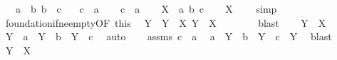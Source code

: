 \begin{isabellebody}
\ \ \ {\isachardoublequoteopen}a\ {\isasymin}\ b{\isachardoublequoteclose}\ {\isachardoublequoteopen}b\ {\isasymin}\ c{\isachardoublequoteclose}\isanewline
\ \ \ {\isachardoublequoteopen}c\ {\isasymnotin}\ a{\isachardoublequoteclose}\isanewline
%
\isadelimproof
%
\endisadelimproof
%
\isatagproof
{}\isamarkupfalse%
\isanewline
\ \ \isamarkupfalse%
\ {\isachardoublequoteopen}c\ {\isasymin}\ a{\isachardoublequoteclose}\isanewline
\ \ \isamarkupfalse%
\ {\isacharquery}{\kern0pt}X\ {\isacharequal}{\kern0pt}\ {\isachardoublequoteopen}{\isacharbraceleft}{\kern0pt}a{\isacharcomma}{\kern0pt}\ b{\isacharcomma}{\kern0pt}\ c{\isacharbraceright}{\kern0pt}{\isachardoublequoteclose}\isanewline
\ \ \isamarkupfalse%
\ {\isachardoublequoteopen}{\isacharquery}{\kern0pt}X\ {\isasymnoteq}\ {\isacharbraceleft}{\kern0pt}{\isacharbraceright}{\kern0pt}{\isachardoublequoteclose}\ \isamarkupfalse%
\ simp\isanewline
\ \ \isamarkupfalse%
\ foundation{\isacharunderscore}{\kern0pt}if{\isacharunderscore}{\kern0pt}ne{\isacharunderscore}{\kern0pt}empty{\isacharbrackleft}{\kern0pt}OF\ this{\isacharbrackright}{\kern0pt}\ \isamarkupfalse%
\ Y\ \ {\isachardoublequoteopen}Y\ {\isasymin}\ {\isacharquery}{\kern0pt}X{\isachardoublequoteclose}\ {\isachardoublequoteopen}Y\ {\isasyminter}\ {\isacharquery}{\kern0pt}X\ {\isacharequal}{\kern0pt}\ {\isacharbraceleft}{\kern0pt}{\isacharbraceright}{\kern0pt}{\isachardoublequoteclose}\isanewline
\ \ \ \ \isamarkupfalse%
\ blast\isanewline
\ \ \isamarkupfalse%
\ {\isacartoucheopen}Y\ {\isasymin}\ {\isacharquery}{\kern0pt}X{\isacartoucheclose}\ \isamarkupfalse%
\ {\isachardoublequoteopen}Y\ {\isacharequal}{\kern0pt}\ a\ {\isasymor}\ Y\ {\isacharequal}{\kern0pt}\ b\ {\isasymor}\ Y\ {\isacharequal}{\kern0pt}\ c{\isachardoublequoteclose}\ \isamarkupfalse%
\ auto\isanewline
\ \ \isamarkupfalse%
\ assms\ {\isacartoucheopen}c\ {\isasymin}\ a{\isacartoucheclose}\ \isamarkupfalse%
\ {\isachardoublequoteopen}a\ {\isasymin}\ Y\ {\isasymor}\ b\ {\isasymin}\ Y\ {\isasymor}\ c\ {\isasymin}\ Y{\isachardoublequoteclose}\ \isamarkupfalse%
\ blast\isanewline
\ \ \isamarkupfalse%
\ {\isacartoucheopen}Y\ {\isasyminter}\ {\isacharquery}{\kern0pt}X\ {\isacharequal}{\kern0pt}\ {\isacharbraceleft}{\kern0pt}{\isacharbraceright}{\kern0pt}{\isacartoucheclose}\ \isamarkupfalse%

\end{isabellebody}

